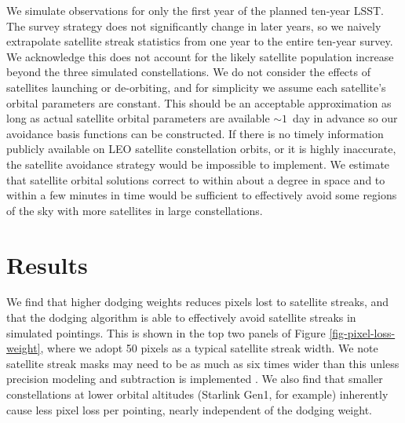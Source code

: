 \documentclass[twocolumn]{aastex631}
\begin{document}
We simulate observations for only the first year of the planned ten-year LSST. The survey strategy does not significantly change in later years, so we naively extrapolate satellite streak statistics from one year to the entire ten-year survey. We acknowledge this does not account for the likely satellite population increase beyond the three simulated constellations. We do not consider the effects of satellites launching or de-orbiting, and for simplicity we assume each satellite's orbital parameters are constant. This should be an acceptable approximation as long as actual satellite orbital parameters are available $\sim1$\ day in advance so our avoidance basis functions can be constructed. If there is no timely information publicly available on LEO satellite constellation orbits, or it is highly inaccurate, the satellite avoidance strategy would be impossible to implement. We estimate that satellite orbital solutions correct to within about a degree in space and to within a few minutes in time would be sufficient to effectively avoid some regions of the sky with more satellites in large constellations.


\section{Results}\label{results}

We find that higher dodging weights reduces pixels lost to satellite streaks, and that the dodging algorithm is able to effectively avoid satellite streaks in simulated pointings. This is shown in the top two panels of Figure \ref{fig-pixel-loss-weight}, where we adopt 50 pixels as a typical satellite streak width. We note satellite streak masks may need to be as much as six times wider than this unless precision modeling and subtraction is implemented \citep{hasan22}. We also find that smaller constellations at lower orbital altitudes (Starlink Gen1, for example) inherently cause less pixel loss per pointing, nearly independent of the dodging weight.

\begin{figure*}[ht!]
\caption{Results from simulating the first year of Rubin observations in the presence of different satellite constellations and varying how strongly the scheduler attempts to avoid satellites. The top panels show that, as expected, the mean streak length per visit (upper left) and fraction of streaked visits (upper right) decrease as more emphasis is put on avoiding satellites. The bottom panels show the resulting trade off, as avoiding satellites forces the scheduler to spend more time slewing and observe less desirable parts of the sky. This result in fewer total exposures in the first year (lower left) and a shallower median co-added survey depth, shown here in $g$-band (lower right).
\label{fig-pixel-loss-weight}}
\end{figure*}
\end{document}
